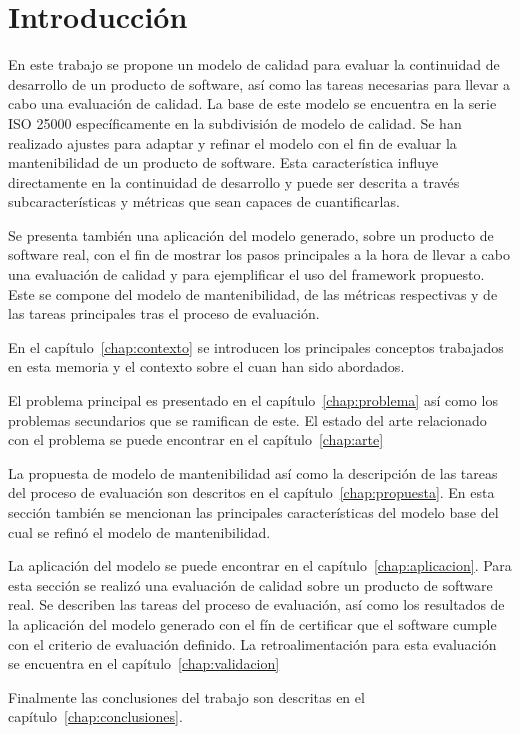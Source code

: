 \chapter{Introducción}
En este trabajo se propone un modelo de calidad para evaluar la continuidad
de desarrollo de un producto de software, así como las tareas necesarias
para llevar a cabo una evaluación de calidad.
La base de este modelo se encuentra en la serie ISO 25000
específicamente en la subdivisión de modelo de calidad.
Se han realizado ajustes para adaptar y refinar el modelo con el fin de evaluar la mantenibilidad de un producto de software.
Esta característica influye directamente en la continuidad de desarrollo y puede
ser descrita a través subcaracterísticas y métricas que sean capaces de cuantificarlas.

Se presenta también una aplicación del modelo generado, sobre un producto de software
real, con el fin de mostrar los pasos principales a la hora de llevar a cabo
una evaluación de calidad y para ejemplificar el uso del framework propuesto. Este se compone
del modelo de mantenibilidad, de las métricas respectivas y de las tareas principales tras el proceso de evaluación.

En el capítulo~\ref{chap:contexto} se introducen los principales conceptos trabajados
en esta memoria y el contexto sobre el cuan han sido abordados.

El problema principal es presentado en el capítulo~\ref{chap:problema} así como
los problemas secundarios que se ramifican de este. El estado del arte relacionado
con el problema se puede encontrar en el capítulo~\ref{chap:arte}

La propuesta de modelo de mantenibilidad así como la descripción de las tareas del proceso
de evaluación son descritos en el capítulo~\ref{chap:propuesta}. En esta sección
también se mencionan las principales características del modelo base del cual
se refinó el modelo de mantenibilidad.

La aplicación del modelo se puede encontrar en el capítulo~\ref{chap:aplicacion}.
Para esta sección se realizó una evaluación de calidad sobre un producto de software
real. Se describen las tareas del proceso de evaluación, así como los resultados
de la aplicación del modelo generado con el fín de certificar que el software
cumple con el criterio de evaluación definido. La retroalimentación para esta evaluación
se encuentra en el capítulo~\ref{chap:validacion}

Finalmente las conclusiones del trabajo son descritas en el capítulo~\ref{chap:conclusiones}.
